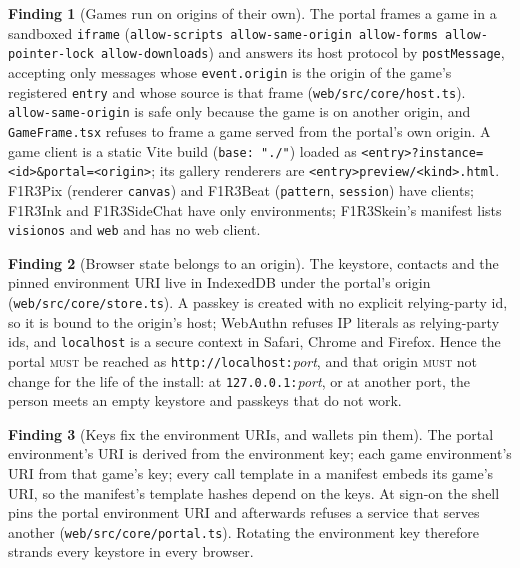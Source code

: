 \documentclass[11pt]{article}
\theoremstyle{definition}
\newtheorem{finding}{Finding}
\theoremstyle{remark}
\newcommand{\MUST}{\textsc{must}}
\newcommand{\code}[1]{\texttt{#1}}
\begin{document}
\begin{finding}[Games run on origins of their own]\label{f:origins}
The portal frames a game in a sandboxed \code{iframe}
(\code{allow-scripts allow-same-origin allow-forms allow-pointer-lock
allow-downloads}) and answers its host protocol by \code{postMessage}, accepting
only messages whose \code{event.origin} is the origin of the game's registered
\code{entry} and whose source is that frame (\code{web/src/core/host.ts}).
\code{allow-same-origin} is safe only because the game is on another origin, and
\code{GameFrame.tsx} refuses to frame a game served from the portal's own origin.
A game client is a static Vite build (\code{base: "./"}) loaded as
\code{<entry>?instance=<id>\&portal=<origin>}; its gallery renderers are
\code{<entry>preview/<kind>.html}. F1R3Pix (renderer \code{canvas}) and F1R3Beat
(\code{pattern}, \code{session}) have clients; F1R3Ink and F1R3SideChat have only
environments; F1R3Skein's manifest lists \code{visionos} and \code{web} and has no web
client.
\end{finding}

\begin{finding}[Browser state belongs to an origin]\label{f:browserstate}
The keystore, contacts and the pinned environment URI live in IndexedDB under the
portal's origin (\code{web/src/core/store.ts}). A passkey is created with no explicit
relying-party id, so it is bound to the origin's host; WebAuthn refuses IP literals
as relying-party ids, and \code{localhost} is a secure context in Safari, Chrome and
Firefox. Hence the portal \MUST{} be reached as \code{http://localhost:}\textit{port},
and that origin \MUST{} not change for the life of the install: at
\code{127.0.0.1:}\textit{port}, or at another port, the person meets an empty
keystore and passkeys that do not work.
\end{finding}

\begin{finding}[Keys fix the environment URIs, and wallets pin them]\label{f:pin}
The portal environment's URI is derived from the environment key; each game
environment's URI from that game's key; every call template in a manifest embeds its
game's URI, so the manifest's template hashes depend on the keys. At sign-on the
shell pins the portal environment URI and afterwards refuses a service that serves
another (\code{web/src/core/portal.ts}). Rotating the environment key therefore
strands every keystore in every browser.
\end{finding}
\end{document}
